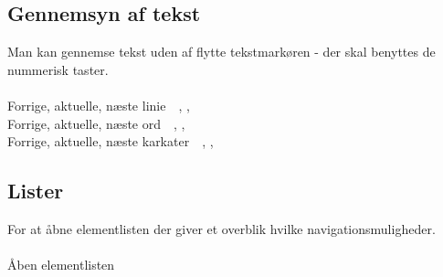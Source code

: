 \documentclass[a4paper, landscape, 11pt]{scrartcl}
\newcommand{\command}[2]{#1~\dotfill{}~#2\\} %
\begin{document}
\begin{multicols}{2}
\subsection*{Gennemsyn af tekst}
Man kan gennemse tekst uden af flytte tekstmarkøren - der skal benyttes de nummerisk taster. \\ \\
\command{Forrige, aktuelle, næste linie}{, , \keys{9}}
\command{Forrige, aktuelle, næste ord}{, , \keys{6}}
\command{Forrige, aktuelle, næste karkater}{, , \keys{3}}

\subsection*{Lister}
For at åbne elementlisten der giver et overblik hvilke navigationsmuligheder. \\ \\
\command{Åben elementlisten}{}

\end{multicols}

\hrulefill{}
\end{document}

